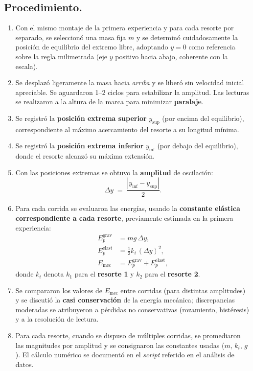 \documentclass[11pt,twocolumn]{article}
\begin{document}
\subsection{Procedimiento.}
\begin{enumerate}[leftmargin=*,itemsep=2pt,topsep=2pt]
    \item Con el mismo montaje de la primera experiencia y para cada resorte por separado, se seleccionó una masa fija $m$ y se determinó cuidadosamente la posición de equilibrio del extremo libre, adoptando $y=0$ como referencia sobre la regla milimetrada (eje $y$ positivo hacia abajo, coherente con la escala).
    \item Se desplazó ligeramente la masa hacia \emph{arriba} y se liberó sin velocidad inicial apreciable. Se aguardaron 1--2 ciclos para estabilizar la amplitud. Las lecturas se realizaron a la altura de la marca para minimizar \textbf{paralaje}.
    \item Se registró la \textbf{posición extrema superior} $y_{\text{sup}}$ (por encima del equilibrio), correspondiente al máximo acercamiento del resorte a su longitud mínima.
    \item Se registró la \textbf{posición extrema inferior} $y_{\text{inf}}$ (por debajo del equilibrio), donde el resorte alcanzó su máxima extensión.
    \item Con las posiciones extremas se obtuvo la \textbf{amplitud} de oscilación:
    \begin{equation*}
        \Delta y \;=\; \frac{|y_{\text{inf}} - y_{\text{sup}}|}{2}.
    \end{equation*}
    \item Para cada corrida se evaluaron las energías, usando la \textbf{constante elástica correspondiente a cada resorte}, previamente estimada en la primera experiencia:
    \begin{align*}
        E_p^{\text{grav}} &= m g\,\Delta y,\\[4pt]
        E_p^{\text{elast}} &= \tfrac{1}{2}k_i\,(\Delta y)^2,\\[4pt]
        E_{\text{mec}} &= E_p^{\text{grav}} + E_p^{\text{elast}},
    \end{align*}
    donde $k_i$ denota $k_1$ para el \textbf{resorte 1} y $k_2$ para el \textbf{resorte 2}.
    \item Se compararon los valores de $E_{\text{mec}}$ entre corridas (para distintas amplitudes) y se discutió la \textbf{casi conservación} de la energía mecánica; discrepancias moderadas se atribuyeron a pérdidas no conservativas (rozamiento, histéresis) y a la resolución de lectura.
    \item Para cada resorte, cuando se dispuso de múltiples corridas, se promediaron las magnitudes por amplitud y se consignaron las constantes usadas ($m$, $k_i$, $g$). El cálculo numérico se documentó en el \textit{script} referido en el análisis de datos.
\end{enumerate}
\end{document}
